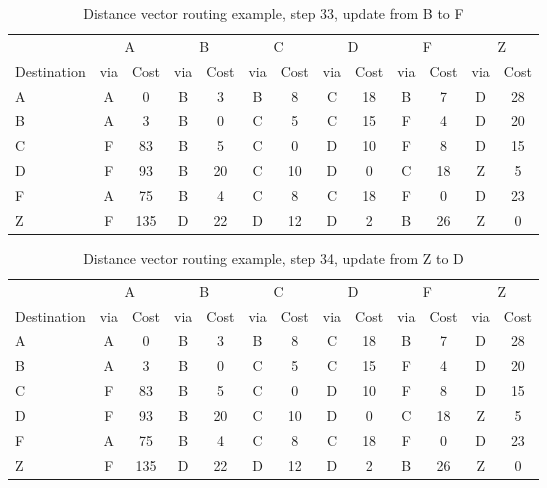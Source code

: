 \begin{table}
    \caption{Distance vector  routing example, step 33, update from B to F }
    \label{tab:dv:step:33}
\begin{tabular}{l|c|c|c|c|c|c|c|c|c|c|c|c}
    \toprule
      & \multicolumn{2}{c|}{A}&\multicolumn{2}{c|}{B}&\multicolumn{2}{c|}{C}&\multicolumn{2}{c|}{D}&\multicolumn{2}{c|}{F}&\multicolumn{2}{c|}{Z} \\
    Destination & via&Cost&via&Cost&via&Cost&via&Cost&via&Cost&via&Cost \\ 
    \midrule
    A & A & 0 &B & 3 &B & 8 &C & 18 &B & 7 &D & 28 
 \\B & A & 3 &B & 0 &C & 5 &C & 15 &F & 4 &D & 20 
 \\C & F & 83 &B & 5 &C & 0 &D & 10 &F & 8 &D & 15 
 \\D & F & 93 &B & 20 &C & 10 &D & 0 &C & 18 &Z & 5 
 \\F & A & 75 &B & 4 &C & 8 &C & 18 &F & 0 &D & 23 
 \\Z & F & 135 &D & 22 &D & 12 &D & 2 &B & 26 &Z & 0 
    \\ \bottomrule 
\end{tabular}
\end{table}
    

\begin{table}
    \caption{Distance vector  routing example, step 34, update from Z to D }
    \label{tab:dv:step:34}
\begin{tabular}{l|c|c|c|c|c|c|c|c|c|c|c|c}
    \toprule
      & \multicolumn{2}{c|}{A}&\multicolumn{2}{c|}{B}&\multicolumn{2}{c|}{C}&\multicolumn{2}{c|}{D}&\multicolumn{2}{c|}{F}&\multicolumn{2}{c|}{Z} \\
    Destination & via&Cost&via&Cost&via&Cost&via&Cost&via&Cost&via&Cost \\ 
    \midrule
    A & A & 0 &B & 3 &B & 8 &C & 18 &B & 7 &D & 28 
 \\B & A & 3 &B & 0 &C & 5 &C & 15 &F & 4 &D & 20 
 \\C & F & 83 &B & 5 &C & 0 &D & 10 &F & 8 &D & 15 
 \\D & F & 93 &B & 20 &C & 10 &D & 0 &C & 18 &Z & 5 
 \\F & A & 75 &B & 4 &C & 8 &C & 18 &F & 0 &D & 23 
 \\Z & F & 135 &D & 22 &D & 12 &D & 2 &B & 26 &Z & 0 
    \\ \bottomrule 
\end{tabular}
\end{table}
    

